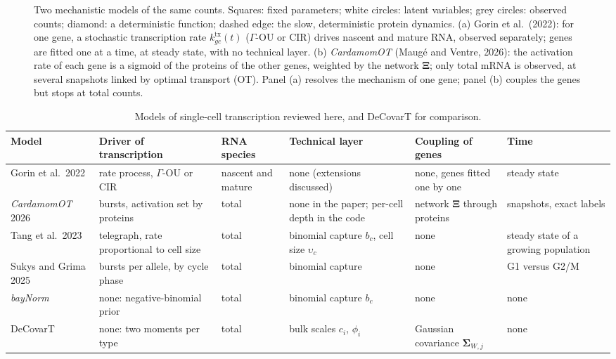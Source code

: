 \begin{figure}[ht]
  \caption{Two mechanistic models of the same counts. Squares: fixed parameters; white circles: latent variables;
    grey circles: observed counts; diamond: a deterministic function; dashed edge: the slow, deterministic protein
    dynamics. (a) Gorin et al.\ (2022): for one gene, a stochastic transcription rate \(k^{\mathrm{tx}}_{gc}(t)\)
    (\(\Gamma\)-OU or CIR) drives nascent and mature RNA, observed separately; genes are fitted one at a time, at steady
    state, with no technical layer. (b) \emph{CardamomOT} (Maugé and Ventre, 2026): the activation rate of each gene is a
    sigmoid of the proteins of the other genes, weighted by the network \(\boldsymbol{\Xi}\); only total mRNA is observed,
    at several snapshots linked by optimal transport (OT). Panel (a) resolves the mechanism of one gene; panel (b)
    couples the genes but stops at total counts.}
  \label{fig:dyn-models}
\end{figure}

\begin{table}[ht]
  \centering
  \footnotesize
  \caption{Models of single-cell transcription reviewed here, and DeCovarT for comparison.}
  \label{tab:dynamic-classes}
  \begin{tabularx}{\textwidth}{@{}lYYYYY@{}}
    \toprule
    Model & Driver of transcription & RNA species & Technical layer & Coupling of genes & Time \\
    \midrule
    Gorin et al.\ 2022 & rate process, \(\Gamma\)-OU or CIR & nascent and mature & none (extensions discussed) & none, genes
      fitted one by one & steady state \\
    \emph{CardamomOT} 2026 & bursts, activation set by proteins & total & none in the paper; per-cell depth in the
      code & network \(\boldsymbol{\Xi}\) through proteins & snapshots, exact labels \\
    Tang et al.\ 2023 & telegraph, rate proportional to cell size & total & binomial capture \(b_{c}\), cell size
      \(\upsilon_{c}\) & none & steady state of a growing population \\
    Sukys and Grima 2025 & bursts per allele, by cycle phase & total & binomial capture & none & G1 versus G2/M \\
    \emph{bayNorm} \cite{tangBayNormBayesianGene2020} & none: negative-binomial prior & total & binomial capture \(b_{c}\) &
      none & none \\
    DeCovarT & none: two moments per type & total & bulk scales \(c_{i}\), \(\phi_{i}\) & Gaussian covariance
      \(\boldsymbol{\Sigma}_{W,j}\) & none \\
    \bottomrule
  \end{tabularx}
\end{table}

